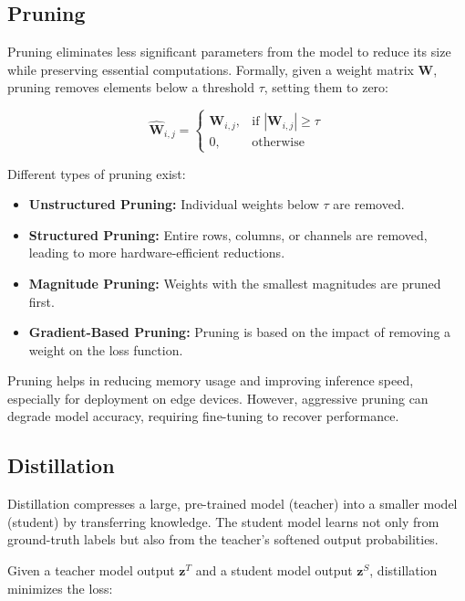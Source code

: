 \subsection{Pruning}

Pruning eliminates less significant parameters from the model to reduce its size while preserving essential computations. Formally, given a weight matrix $\mathbf{W}$, pruning removes elements below a threshold $\tau$, setting them to zero:

\begin{equation}
    \hat{\mathbf{W}}_{i,j} =
    \begin{cases}
        \mathbf{W}_{i,j}, & \text{if } |\mathbf{W}_{i,j}| \geq \tau \\
        0, & \text{otherwise}
    \end{cases}
\end{equation}

Different types of pruning exist:

\begin{itemize}
    \item \textbf{Unstructured Pruning:} Individual weights below $\tau$ are removed.
    \item \textbf{Structured Pruning:} Entire rows, columns, or channels are removed, leading to more hardware-efficient reductions.
    \item \textbf{Magnitude Pruning:} Weights with the smallest magnitudes are pruned first.
    \item \textbf{Gradient-Based Pruning:} Pruning is based on the impact of removing a weight on the loss function.
\end{itemize}

Pruning helps in reducing memory usage and improving inference speed, especially for deployment on edge devices. However, aggressive pruning can degrade model accuracy, requiring fine-tuning to recover performance.

\subsection{Distillation}

Distillation compresses a large, pre-trained model (teacher) into a smaller model (student) by transferring knowledge. The student model learns not only from ground-truth labels but also from the teacher’s softened output probabilities.\medskip

Given a teacher model output $\mathbf{z}^T$ and a student model output $\mathbf{z}^S$, distillation minimizes the loss:

